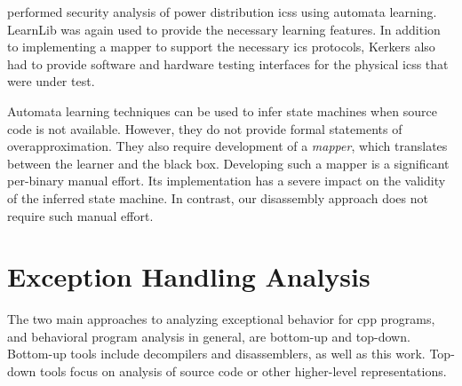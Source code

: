 \Textcite{kerkers2017assessing} performed security analysis
of power distribution \acp{ics} using automata learning.
LearnLib was again used to provide the necessary learning features.
In addition to implementing a mapper to support the necessary \ac{ics}
protocols, Kerkers also had to provide software and hardware testing interfaces for the physical \acp{ics} that were under test.

Automata learning techniques can be used to infer state machines when source code is not available.
However, they do not provide formal statements of overapproximation.
They also require development of a \emph{mapper}, which translates between the learner and the black box.
Developing such a mapper is a significant per-binary manual effort.
Its implementation has a severe impact on the validity of the inferred state machine.
In contrast, our disassembly approach does not require such manual effort.

\section{Exception Handling Analysis}\label{related-exceptions}
The two main approaches to analyzing exceptional behavior for \gls{cpp} programs, and behavioral program analysis in general, are bottom-up and top-down.
Bottom-up tools include decompilers and disassemblers, as well as this work.
Top-down tools focus on analysis of source code or other higher-level representations.

